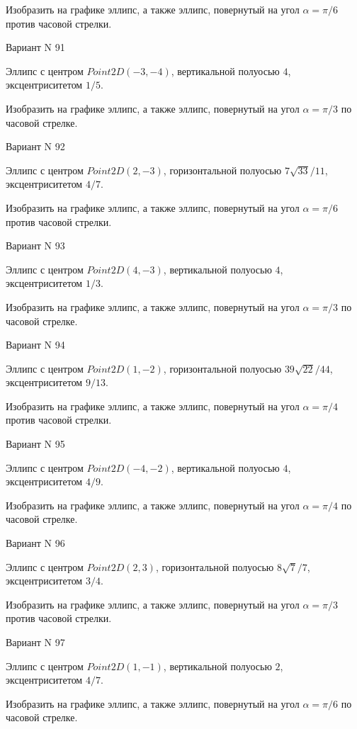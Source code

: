 \documentclass[11pt]{report}
\begin{document}
    Изобразить на графике эллипс, а также эллипс, повернутый на угол $\alpha = $$\pi / 6$ против часовой стрелки.

Вариант N 91

Эллипс с центром $Point2D\left(-3, -4\right)$, вертикальной полуосью $4$, эксцентриситетом $1 / 5$.

    Изобразить на графике эллипс, а также эллипс, повернутый на угол $\alpha = $$\pi / 3$ по часовой стрелке.

Вариант N 92

Эллипс с центром $Point2D\left(2, -3\right)$, горизонтальной полуосью $7 \sqrt{33} / 11$, эксцентриситетом $4 / 7$.

    Изобразить на графике эллипс, а также эллипс, повернутый на угол $\alpha = $$\pi / 6$ против часовой стрелки.

Вариант N 93

Эллипс с центром $Point2D\left(4, -3\right)$, вертикальной полуосью $4$, эксцентриситетом $1 / 3$.

    Изобразить на графике эллипс, а также эллипс, повернутый на угол $\alpha = $$\pi / 3$ по часовой стрелке.

Вариант N 94

Эллипс с центром $Point2D\left(1, -2\right)$, горизонтальной полуосью $39 \sqrt{22} / 44$, эксцентриситетом $9 / 13$.

    Изобразить на графике эллипс, а также эллипс, повернутый на угол $\alpha = $$\pi / 4$ против часовой стрелки.

Вариант N 95

Эллипс с центром $Point2D\left(-4, -2\right)$, вертикальной полуосью $4$, эксцентриситетом $4 / 9$.

    Изобразить на графике эллипс, а также эллипс, повернутый на угол $\alpha = $$\pi / 4$ по часовой стрелке.

Вариант N 96

Эллипс с центром $Point2D\left(2, 3\right)$, горизонтальной полуосью $8 \sqrt{7} / 7$, эксцентриситетом $3 / 4$.

    Изобразить на графике эллипс, а также эллипс, повернутый на угол $\alpha = $$\pi / 3$ против часовой стрелки.

Вариант N 97

Эллипс с центром $Point2D\left(1, -1\right)$, вертикальной полуосью $2$, эксцентриситетом $4 / 7$.

    Изобразить на графике эллипс, а также эллипс, повернутый на угол $\alpha = $$\pi / 6$ по часовой стрелке.
\end{document}
